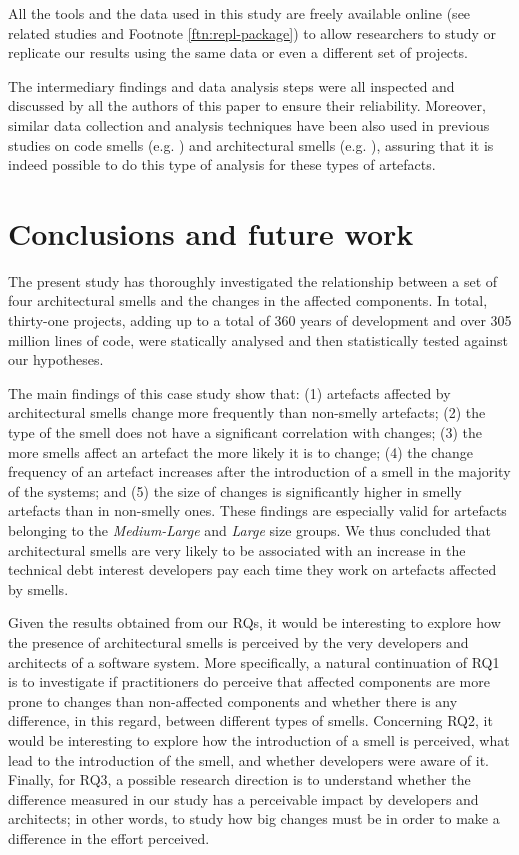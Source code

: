 All the tools and the data used in this study are freely available online (see related studies and Footnote \ref{ftn:repl-package}) to allow researchers to study or replicate our results using the same data or even a different set of projects.

The intermediary findings and data analysis steps were all inspected and discussed by all the authors of this paper to ensure their reliability.
Moreover, similar data collection and analysis techniques have been also used in previous studies on code smells (e.g. \cite{Khomh2009}) and architectural smells (e.g. \cite{Le2018}), assuring that it is indeed possible to do this type of analysis for these types of artefacts.

\section{Conclusions and future work}\label{c5:sec:conclusion}
The present study has thoroughly investigated the relationship between a set of four architectural smells and the changes in the affected components.
In total, thirty-one projects, adding up to a total of 360 years of development and  over 305 million lines of code, were statically analysed and then statistically tested against our hypotheses.

The main findings of this case study show that: (1) artefacts affected by architectural smells change more frequently than non-smelly artefacts; (2) the type of the smell does not have a significant correlation with changes; (3) the more smells affect an artefact the more likely it is to change; (4) the change frequency of an artefact increases after the introduction of a smell in the majority of the systems; and (5) the size of changes is significantly higher in smelly artefacts than in non-smelly ones.
These findings are especially valid for artefacts belonging to the \emph{Medium-Large} and \emph{Large} size groups.
We thus concluded that architectural smells are very likely to be associated with an increase in the technical debt interest developers pay each time they work on artefacts affected by smells.

Given the results obtained from our RQs, it would be interesting to explore how the presence of architectural smells is perceived by the very developers and architects of a software system.
More specifically, a natural continuation of RQ1 is to investigate if practitioners do perceive that affected components are more prone to changes than non-affected components and whether there is any difference, in this regard, between different types of smells.
Concerning RQ2, it would be interesting to explore how the introduction of a smell is perceived, what lead to the introduction of the smell, and whether developers were aware of it.
Finally, for RQ3, a possible research direction is to understand whether the difference measured in our study has a perceivable impact by developers and architects; in other words, to study how big changes must be in order to make a difference in the effort perceived.


